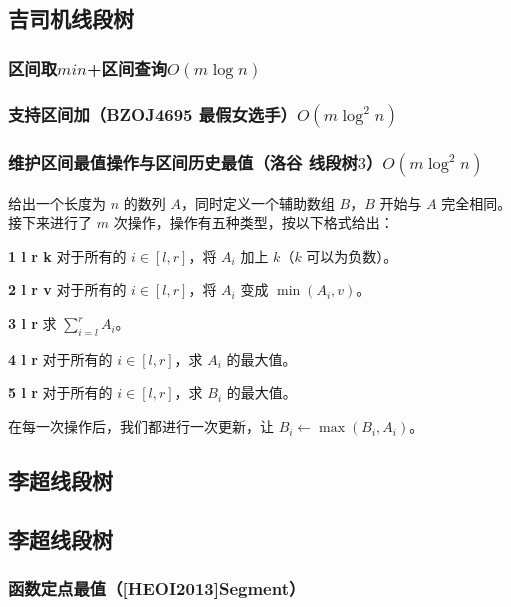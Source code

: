 \documentclass[landscape,twocolumn,twoside,a4paper]{article}
\begin{document}
\subsection{吉司机线段树}

\subsubsection{区间取$min$+区间查询$O(m \log n)$}


\subsubsection{支持区间加（BZOJ4695 最假女选手）$O(m \log ^{2}n)$}


\subsubsection{维护区间最值操作与区间历史最值（洛谷 线段树$3$）$O(m \log ^{2}n)$}
给出一个长度为 $n$ 的数列 $A$，同时定义一个辅助数组 $B$，$B$ 开始与 $A$ 完全相同。接下来进行了 $m$ 次操作，操作有五种类型，按以下格式给出：\par
\textbf{1 l r k} 对于所有的 $i\in[l,r]$，将 $A_i$ 加上 $k$（$k$ 可以为负数）。\par
\textbf{2 l r v} 对于所有的 $i\in[l,r]$，将 $A_i$ 变成 $\min(A_i,v)$。\par
\textbf{3 l r} 求 $\sum_{i=l}^{r}A_i$。\par
\textbf{4 l r} 对于所有的 $i\in[l,r]$，求 $A_i$ 的最大值。\par
\textbf{5 l r} 对于所有的 $i\in[l,r]$，求 $B_i$ 的最大值。\par
在每一次操作后，我们都进行一次更新，让 $B_i\gets\max(B_i,A_i)$。\par


\subsection{李超线段树}

\subsection{李超线段树}
\subsubsection{函数定点最值（[HEOI2013]Segment）}

\end{document}
